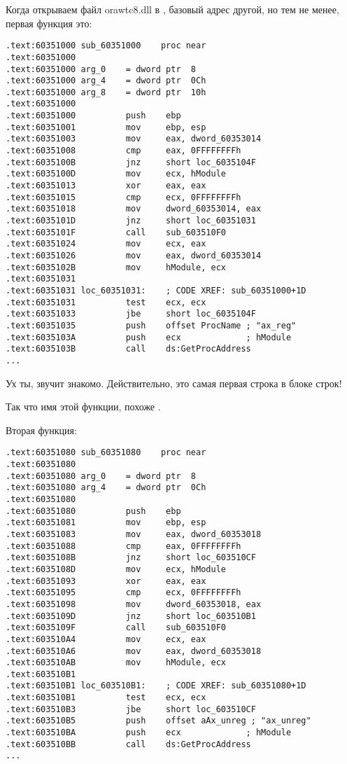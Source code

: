 Когда открываем файл orawtc8.dll в \IDA, базовый адрес другой, но тем не менее, первая функция это:

\begin{lstlisting}[style=customasmx86]
.text:60351000 sub_60351000    proc near
.text:60351000
.text:60351000 arg_0    = dword ptr  8
.text:60351000 arg_4    = dword ptr  0Ch
.text:60351000 arg_8    = dword ptr  10h
.text:60351000
.text:60351000          push    ebp
.text:60351001          mov     ebp, esp
.text:60351003          mov     eax, dword_60353014
.text:60351008          cmp     eax, 0FFFFFFFFh
.text:6035100B          jnz     short loc_6035104F
.text:6035100D          mov     ecx, hModule
.text:60351013          xor     eax, eax
.text:60351015          cmp     ecx, 0FFFFFFFFh
.text:60351018          mov     dword_60353014, eax
.text:6035101D          jnz     short loc_60351031
.text:6035101F          call    sub_603510F0
.text:60351024          mov     ecx, eax
.text:60351026          mov     eax, dword_60353014
.text:6035102B          mov     hModule, ecx
.text:60351031
.text:60351031 loc_60351031:    ; CODE XREF: sub_60351000+1D
.text:60351031          test    ecx, ecx
.text:60351033          jbe     short loc_6035104F
.text:60351035          push    offset ProcName ; "ax_reg"
.text:6035103A          push    ecx             ; hModule
.text:6035103B          call    ds:GetProcAddress
...
\end{lstlisting}

Ух ты,  звучит знакомо. 
Действительно, это самая первая строка в блоке строк!

Так что имя этой функции, похоже .

Вторая функция:

\begin{lstlisting}[style=customasmx86]
.text:60351080 sub_60351080    proc near
.text:60351080
.text:60351080 arg_0    = dword ptr  8
.text:60351080 arg_4    = dword ptr  0Ch
.text:60351080
.text:60351080          push    ebp
.text:60351081          mov     ebp, esp
.text:60351083          mov     eax, dword_60353018
.text:60351088          cmp     eax, 0FFFFFFFFh
.text:6035108B          jnz     short loc_603510CF
.text:6035108D          mov     ecx, hModule
.text:60351093          xor     eax, eax
.text:60351095          cmp     ecx, 0FFFFFFFFh
.text:60351098          mov     dword_60353018, eax
.text:6035109D          jnz     short loc_603510B1
.text:6035109F          call    sub_603510F0
.text:603510A4          mov     ecx, eax
.text:603510A6          mov     eax, dword_60353018
.text:603510AB          mov     hModule, ecx
.text:603510B1
.text:603510B1 loc_603510B1:    ; CODE XREF: sub_60351080+1D
.text:603510B1          test    ecx, ecx
.text:603510B3          jbe     short loc_603510CF
.text:603510B5          push    offset aAx_unreg ; "ax_unreg"
.text:603510BA          push    ecx             ; hModule
.text:603510BB          call    ds:GetProcAddress
...
\end{lstlisting}

